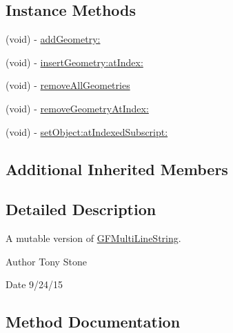 \subsection*{Instance Methods}
\begin{DoxyCompactItemize}
\item 
(void) -\/ \hyperlink{interface_g_f_mutable_multi_line_string_adb3759e4cbd6c48eaa32046508753260}{add\+Geometry\+:}
\item 
(void) -\/ \hyperlink{interface_g_f_mutable_multi_line_string_a86fb48dc7d1f45c6ca713ad1692b22ff}{insert\+Geometry\+:at\+Index\+:}
\item 
(void) -\/ \hyperlink{interface_g_f_mutable_multi_line_string_ae25e7e5a7a8fc6991b3647ff7fe7b600}{remove\+All\+Geometries}
\item 
(void) -\/ \hyperlink{interface_g_f_mutable_multi_line_string_a712b2e48823c1b6b488190118e662651}{remove\+Geometry\+At\+Index\+:}
\item 
(void) -\/ \hyperlink{interface_g_f_mutable_multi_line_string_aaca63dc6cfeccfb2adbaafb20e74942c}{set\+Object\+:at\+Indexed\+Subscript\+:}
\end{DoxyCompactItemize}
\subsection*{Additional Inherited Members}


\subsection{Detailed Description}
A mutable version of \hyperlink{interface_g_f_multi_line_string}{G\+F\+Multi\+Line\+String}. 

\begin{DoxyAuthor}{Author}
Tony Stone 
\end{DoxyAuthor}
\begin{DoxyDate}{Date}
9/24/15 
\end{DoxyDate}


\subsection{Method Documentation}
\hypertarget{interface_g_f_mutable_multi_line_string_adb3759e4cbd6c48eaa32046508753260}{}
